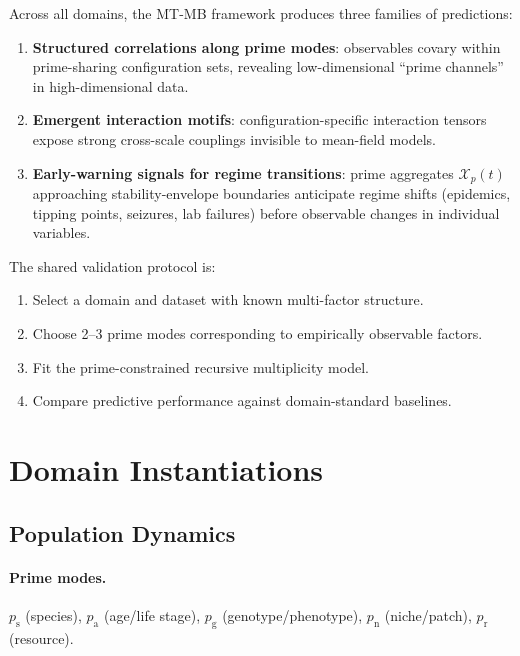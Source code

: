 \documentclass[12pt,letterpaper]{article}
\begin{document}
Across all domains, the MT-MB framework produces three families of predictions:

\begin{enumerate}[leftmargin=*]
  \item \textbf{Structured correlations along prime modes}: observables covary
    within prime-sharing configuration sets, revealing low-dimensional
    ``prime channels'' in high-dimensional data.
  \item \textbf{Emergent interaction motifs}: configuration-specific interaction
    tensors expose strong cross-scale couplings invisible to mean-field models.
  \item \textbf{Early-warning signals for regime transitions}: prime aggregates
    $\mathcal{X}_p(t)$ approaching stability-envelope boundaries anticipate
    regime shifts (epidemics, tipping points, seizures, lab failures) before
    observable changes in individual variables.
\end{enumerate}

The shared validation protocol is:
\begin{enumerate}[leftmargin=*]
  \item Select a domain and dataset with known multi-factor structure.
  \item Choose 2--3 prime modes corresponding to empirically observable factors.
  \item Fit the prime-constrained recursive multiplicity model.
  \item Compare predictive performance against domain-standard baselines.
\end{enumerate}

\newpage
\section{Domain Instantiations}
\label{sec:domains}

\subsection{Population Dynamics}

\paragraph{Prime modes.}
$p_{\text{s}}$ (species), $p_{\text{a}}$ (age/life stage), $p_{\text{g}}$
(genotype/phenotype), $p_{\text{n}}$ (niche/patch), $p_{\text{r}}$ (resource).
\end{document}
